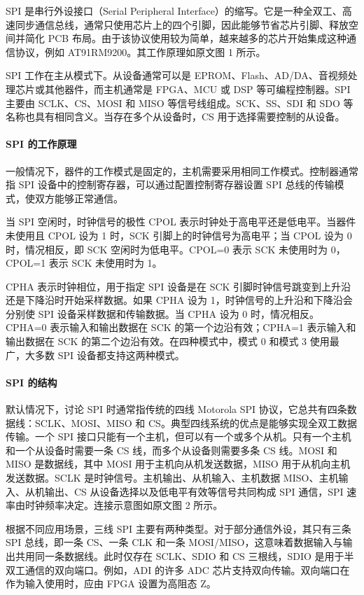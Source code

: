 \documentclass[12pt,a4paper]{article}
\numberwithin{equation}{section}
\begin{document}
SPI 是串行外设接口（Serial Peripheral Interface）的缩写。它是一种全双工、高速同步通信总线，通常只使用芯片上的四个引脚，因此能够节省芯片引脚、释放空间并简化 PCB 布局。由于该协议使用较为简单，越来越多的芯片开始集成这种通信协议，例如 AT91RM9200。其工作原理如原文图 1 所示。

SPI 工作在主从模式下。从设备通常可以是 EPROM、Flash、AD/DA、音视频处理芯片或其他器件，而主机通常是 FPGA、MCU 或 DSP 等可编程控制器。SPI 主要由 SCLK、CS、MOSI 和 MISO 等信号线组成。SCK、SS、SDI 和 SDO 等名称也具有相同含义。当存在多个从设备时，CS 用于选择需要控制的从设备。

\paragraph{SPI 的工作原理}

一般情况下，器件的工作模式是固定的，主机需要采用相同工作模式。控制器通常指 SPI 设备中的控制寄存器，可以通过配置控制寄存器设置 SPI 总线的传输模式，使双方能够正常通信。

当 SPI 空闲时，时钟信号的极性 CPOL 表示时钟处于高电平还是低电平。当器件未使用且 CPOL 设为 1 时，SCK 引脚上的时钟信号为高电平；当 CPOL 设为 0 时，情况相反，即 SCK 空闲时为低电平。CPOL=0 表示 SCK 未使用时为 0，CPOL=1 表示 SCK 未使用时为 1。

CPHA 表示时钟相位，用于指定 SPI 设备是在 SCK 引脚时钟信号跳变到上升沿还是下降沿时开始采样数据。如果 CPHA 设为 1，时钟信号的上升沿和下降沿会分别使 SPI 设备采样数据和传输数据。当 CPHA 设为 0 时，情况相反。CPHA=0 表示输入和输出数据在 SCK 的第一个边沿有效；CPHA=1 表示输入和输出数据在 SCK 的第二个边沿有效。在四种模式中，模式 0 和模式 3 使用最广，大多数 SPI 设备都支持这两种模式。

\paragraph{SPI 的结构}

默认情况下，讨论 SPI 时通常指传统的四线 Motorola SPI 协议，它总共有四条数据线：SCLK、MOSI、MISO 和 CS。典型四线系统的优点是能够实现全双工数据传输。一个 SPI 接口只能有一个主机，但可以有一个或多个从机。只有一个主机和一个从设备时需要一条 CS 线，而多个从设备则需要多条 CS 线。MOSI 和 MISO 是数据线，其中 MOSI 用于主机向从机发送数据，MISO 用于从机向主机发送数据。SCLK 是时钟信号。主机输出、从机输入、主机数据 MISO、主机输入、从机输出、CS 从设备选择以及低电平有效等信号共同构成 SPI 通信，SPI 速率由时钟频率决定。连接示意图如原文图 2 所示。

根据不同应用场景，三线 SPI 主要有两种类型。对于部分通信外设，其只有三条 SPI 总线，即一条 CS、一条 CLK 和一条 MOSI/MISO，这意味着数据输入与输出共用同一条数据线。此时仅存在 SCLK、SDIO 和 CS 三根线，SDIO 是用于半双工通信的双向端口。例如，ADI 的许多 ADC 芯片支持双向传输。双向端口在作为输入使用时，应由 FPGA 设置为高阻态 Z。
\end{document}
